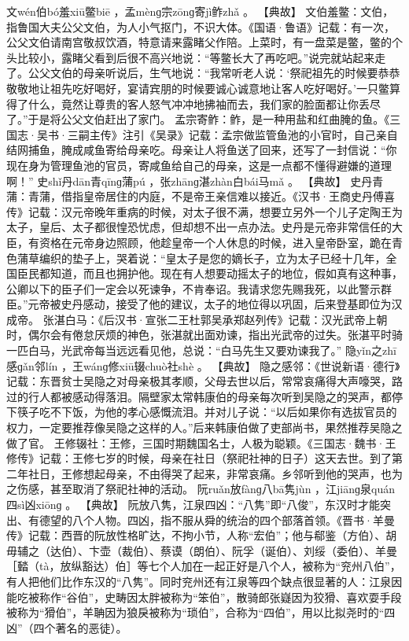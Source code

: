 \documentclass[12pt,UTF8]{ctexbook}
\begin{document}
文wén伯bó羞xiū鳖biē
，孟mènɡ宗zōnɡ寄jì鲊zhǎ
。
【典故】
文伯羞鳖：文伯，指鲁国大夫公父文伯，为人小气抠门，不识大体。《国语·鲁语》记载：有一次，公父文伯请南宫敬叔饮酒，特意请来露睹父作陪。上菜时，有一盘菜是鳖，鳖的个头比较小，露睹父看到后很不高兴地说：“等鳖长大了再吃吧。”说完就站起来走了。公父文伯的母亲听说后，生气地说：“我常听老人说：‘祭祀祖先的时候要恭恭敬敬地让祖先吃好喝好，宴请宾朋的时候要诚心诚意地让客人吃好喝好。’一只鳖算得了什么，竟然让尊贵的客人怒气冲冲地拂袖而去，我们家的脸面都让你丢尽了。”于是将公父文伯赶出了家门。
孟宗寄鲊：鲊，是一种用盐和红曲腌的鱼。《三国志·吴书·三嗣主传》注引《吴录》记载：孟宗做监管鱼池的小官时，自己亲自结网捕鱼，腌成咸鱼寄给母亲吃。母亲让人将鱼送了回来，还写了一封信说：“你现在身为管理鱼池的官员，寄咸鱼给自己的母亲，这是一点都不懂得避嫌的道理啊！”
史shǐ丹dān青qīnɡ蒲pú
，张zhānɡ湛zhàn白bái马mǎ
。
【典故】
史丹青蒲：青蒲，借指皇帝居住的内庭，不是帝王亲信难以接近。《汉书·王商史丹傅喜传》记载：汉元帝晚年重病的时候，对太子很不满，想要立另外一个儿子定陶王为太子，皇后、太子都很惶恐忧虑，但却想不出一点办法。史丹是元帝非常信任的大臣，有资格在元帝身边照顾，他趁皇帝一个人休息的时候，进入皇帝卧室，跪在青色蒲草编织的垫子上，哭着说：“皇太子是您的嫡长子，立为太子已经十几年，全国臣民都知道，而且也拥护他。现在有人想要动摇太子的地位，假如真有这种事，公卿以下的臣子们一定会以死谏争，不肯奉诏。我请求您先赐我死，以此警示群臣。”元帝被史丹感动，接受了他的建议，太子的地位得以巩固，后来登基即位为汉成帝。
张湛白马：《后汉书·宣张二王杜郭吴承郑赵列传》记载：汉光武帝上朝时，偶尔会有倦怠厌烦的神色，张湛就出面劝谏，指出光武帝的过失。张湛平时骑一匹白马，光武帝每当远远看见他，总说：“白马先生又要劝谏我了。”
隐yǐn之zhī感ɡǎn邻lín
，王wánɡ修xiū辍chuò社shè
。
【典故】
隐之感邻：《世说新语·德行》记载：东晋贫士吴隐之对母亲极其孝顺，父母去世以后，常常哀痛得大声嚎哭，路过的行人都被感动得落泪。隔壁家太常韩康伯的母亲每次听到吴隐之的哭声，都停下筷子吃不下饭，为他的孝心感慨流泪。并对儿子说：“以后如果你有选拔官员的权力，一定要推荐像吴隐之这样的人。”后来韩康伯做了吏部尚书，果然推荐吴隐之做了官。
王修辍社：王修，三国时期魏国名士，人极为聪颖。《三国志·魏书·王修传》记载：王修七岁的时候，母亲在社日（祭祀社神的日子）这天去世。到了第二年社日，王修想起母亲，不由得哭了起来，非常哀痛。乡邻听到他的哭声，也为之伤感，甚至取消了祭祀社神的活动。
阮ruǎn放fànɡ八bā隽jùn
，江jiānɡ泉quán四sì凶xiōnɡ
。
【典故】
阮放八隽，江泉四凶：“八隽”即“八俊”，东汉时才能突出、有德望的八个人物。四凶，指不服从舜的统治的四个部落首领。《晋书·羊曼传》记载：西晋的阮放性格旷达，不拘小节，人称“宏伯”；他与郗鉴（方伯）、胡毋辅之（达伯）、卞壶（裁伯）、蔡谟（朗伯）、阮孚（诞伯）、刘绥（委伯）、羊曼［濌（tà，放纵豁达）伯］等七个人加在一起正好是八个人，被称为“兖州八伯”，有人把他们比作东汉的“八隽”。同时兖州还有江泉等四个缺点很显著的人：江泉因能吃被称作“谷伯”，史畴因太胖被称为“笨伯”，散骑郎张嶷因为狡猾、喜欢耍手段被称为“猾伯”，羊聃因为狼戾被称为“琐伯”，合称为“四伯”，用以比拟尧时的“四凶”（四个著名的恶徒）。
\end{document}
